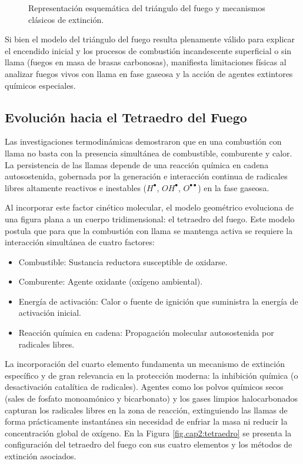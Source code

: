 \begin{figure}[!ht]
    \centering
    
    \caption{Representación esquemática del triángulo del fuego y mecanismos clásicos de extinción.}
    \label{fig.cap2:triangulo}
\end{figure}

Si bien el modelo del triángulo del fuego resulta plenamente válido para explicar el encendido inicial y los procesos
de combustión incandescente superficial o sin llama (fuegos en masa de brasas carbonosas), manifiesta limitaciones
físicas al analizar fuegos vivos con llama en fase gaseosa y la acción de agentes extintores químicos especiales.

\subsection{Evolución hacia el Tetraedro del Fuego}

Las investigaciones termodinámicas demostraron que en una combustión con llama no basta con la presencia simultánea de
combustible, comburente y calor. La persistencia de las llamas depende de una reacción química en cadena autosostenida,
gobernada por la generación e interacción continua de radicales libres altamente reactivos e inestables ($H^\bullet$,
$OH^\bullet$, $O^{\bullet\bullet}$) en la fase gaseosa.

Al incorporar este factor cinético molecular, el modelo geométrico evoluciona de una figura plana a un cuerpo
tridimensional: el tetraedro del fuego. Este modelo postula que para que la combustión con llama se mantenga activa se
requiere la interacción simultánea de cuatro factores:
\begin{itemize}
    \item Combustible: Sustancia reductora susceptible de oxidarse.
    \item Comburente: Agente oxidante (oxígeno ambiental).
    \item Energía de activación: Calor o fuente de ignición que suministra la energía de activación inicial.
    \item Reacción química en cadena: Propagación molecular autosostenida por radicales libres.
\end{itemize}

La incorporación del cuarto elemento fundamenta un mecanismo de extinción específico y de gran relevancia en la
protección moderna: la inhibición química (o desactivación catalítica de radicales). Agentes como los polvos químicos
secos (sales de fosfato monoamónico y bicarbonato) y los gases limpios halocarbonados capturan los radicales libres en la
zona de reacción, extinguiendo las llamas de forma prácticamente instantánea sin necesidad de enfriar la masa ni reducir
la concentración global de oxígeno. En la Figura \ref{fig.cap2:tetraedro} se presenta la configuración del tetraedro del
fuego con sus cuatro elementos y los métodos de extinción asociados.

